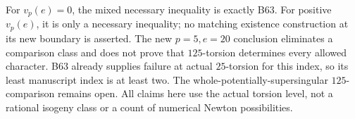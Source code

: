 \begin{remark}
\label{rem:B-RD76-scope}
For \(v_p(e)=0\), the mixed necessary inequality is exactly B63.
For positive \(v_p(e)\), it is only a necessary inequality; no
matching existence construction at its new boundary is asserted.
The new \(p=5,e=20\) conclusion eliminates a comparison class
and does not prove that \(125\)-torsion determines every allowed
character. B63 already supplies failure at actual \(25\)-torsion
for this index, so its least manuscript index is at least two.
The whole-potentially-supersingular \(125\)-comparison remains
open. All claims here use the actual torsion level, not a rational
isogeny class or a count of numerical Newton possibilities.
\end{remark}
